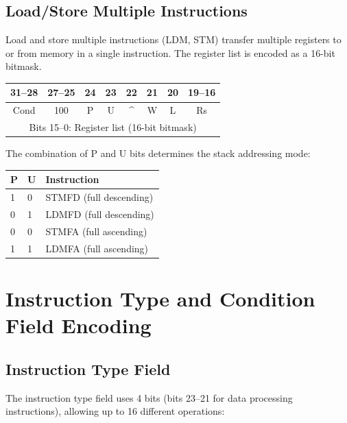 \documentclass[11pt, a4paper, notitlepage]{report}
\theoremstyle{definition}
\theoremstyle{remark}
\theoremstyle{definition}
\begin{document}
\subsection{Load/Store Multiple Instructions}

Load and store multiple instructions (LDM, STM) transfer multiple registers to or from memory in a single instruction. The register list is encoded as a 16-bit bitmask.

\begin{center}
\begin{tabular}{|c|c|c|c|c|c|c|c|}
\hline
31--28 & 27--25 & 24 & 23 & 22 & 21 & 20 & 19--16 \\
\hline
Cond & 100 & P & U & \^{} & W & L & Rs \\
\hline
\multicolumn{8}{|c|}{Bits 15--0: Register list (16-bit bitmask)} \\
\hline
\end{tabular}
\end{center}

The combination of P and U bits determines the stack addressing mode:

\begin{center}
\begin{tabular}{lll}
\toprule
\textbf{P} & \textbf{U} & \textbf{Instruction} \\
\midrule
1 & 0 & STMFD (full descending) \\
0 & 1 & LDMFD (full descending) \\
0 & 0 & STMFA (full ascending) \\
1 & 1 & LDMFA (full ascending) \\
\bottomrule
\end{tabular}
\end{center}

\section{Instruction Type and Condition Field Encoding}

\subsection{Instruction Type Field}

The instruction type field uses 4 bits (bits 23--21 for data processing instructions), allowing up to 16 different operations:
\end{document}
